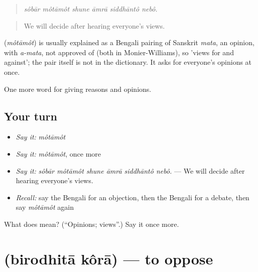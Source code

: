 \begin{quote}
     
\end{quote}

\begin{quote}
\emph{sôbār môtāmôt shune āmrā siddhāntô nebô.}
\end{quote}

\begin{quote}
We will decide after hearing everyone's views.
\end{quote}

\begin{cousinweb}
\textbf{} (\emph{môtāmôt}) is usually explained as a Bengali pairing of Sanskrit \emph{mata}, an opinion, with \emph{a-mata}, not approved of (both in Monier-Williams), so 'views for and against'; the pair itself is not in the dictionary. It asks for everyone's opinions at once.
\end{cousinweb}

\begin{grammarlens}[title={What you've built}]
One more word for giving reasons and opinions.
\end{grammarlens}

\subsection*{Your turn}
\begin{itemize}
\raggedright
  \item \emph{Say it:} \emph{môtāmôt}
  \item \emph{Say it:} \emph{môtāmôt}, once more
  \item \emph{Say it:} \emph{sôbār môtāmôt shune āmrā siddhāntô nebô.} — We will decide after hearing everyone's views.
  \item \emph{Recall:} say the Bengali for an objection, then the Bengali for a debate, then say \emph{môtāmôt} again
\end{itemize}

\begin{tcolorbox}[breakable,colback=teal!4,colframe=teal!35!black,title={Before you move on}]
What does  mean? (\textquotedblleft{}Opinions; views\textquotedblright{}.) Say it once more.
\end{tcolorbox}
\section[\texorpdfstring{\bn{বিরোধিতা} \bn{করা} (birodhitā kôrā)}{বিরোধিতা করা (birodhitā kôrā)}]{  (birodhitā kôrā) — to oppose}

